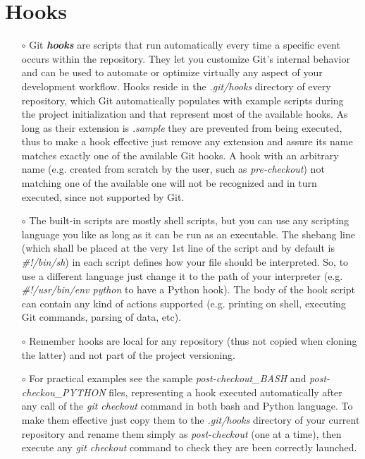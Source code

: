 \documentclass[a4paper,portrait,10pt]{article}   %
\newcommand{\mybulletlvA}{$\circ$}   %
\newcommand{\myparvspace}{\vspace{4mm}}   %
\begin{document}
\section{Hooks}   \label{sec:Hooks}

\begin{itemize}
\item[\mybulletlvA] Git \textbf{\textit{hooks}} are scripts that run automatically every time a specific event occurs within the repository. They let you customize Git’s internal behavior and can be used to automate or optimize virtually any aspect of your development workflow. Hooks reside in the \textit{.git/hooks} directory of every repository, which Git automatically populates with example scripts during the project initialization and that represent most of the available hooks. As long as their extension is \textit{.sample} they are prevented from being executed, thus to make a hook effective just remove any extension and assure its name matches exactly one of the available Git hooks. A hook with an arbitrary name (e.g. created from scratch by the user, such as \textit{pre-checkout}) not matching one of the available one will not be recognized and in turn executed, since not supported by Git.
\myparvspace

\item[\mybulletlvA] The built-in scripts are mostly shell scripts, but you can use any scripting language you like as long as it can be run as an executable. The shebang line (which shall be placed at the very 1st line of the script and by default is \textit{\#!/bin/sh}) in each script defines how your file should be interpreted. So, to use a different language just change it to the path of your interpreter (e.g. \textit{\#!/usr/bin/env python} to have a Python hook). The body of the hook script can contain any kind of actions supported (e.g. printing on shell, executing Git commands, parsing of data, etc).
\myparvspace

\item[\mybulletlvA] Remember hooks are local for any repository (thus not copied when cloning the latter) and not part of the project versioning.
\myparvspace

\item[\mybulletlvA] For practical examples see the sample \textit{post-checkout\_BASH} and \textit{post-checkou\_PYTHON} files, representing a hook executed automatically after any call of the \textit{git checkout} command in both bash and Python language. To make them effective just copy them to the \textit{.git/hooks} directory of your current repository and rename them simply as \textit{post-checkout} (one at a time), then execute any \textit{git checkout} command to check they are been correctly launched.
\myparvspace


\end{itemize}
\end{document}
